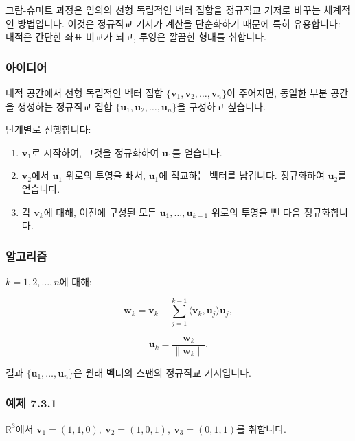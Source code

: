 \documentclass[
  12pt,
  a4paper,
]{article}
\begin{document}
그람-슈미트 과정은 임의의 선형 독립적인 벡터 집합을 정규직교 기저로 바꾸는 체계적인 방법입니다. 이것은 정규직교 기저가 계산을 단순화하기 때문에 특히 유용합니다: 내적은 간단한 좌표 비교가 되고, 투영은 깔끔한 형태를 취합니다.

\subsubsection{아이디어}\label{the-idea}

내적 공간에서 선형 독립적인 벡터 집합 \(\{\mathbf{v}_1, \mathbf{v}_2, \dots, \mathbf{v}_n\}\)이 주어지면, 동일한 부분 공간을 생성하는 정규직교 집합 \(\{\mathbf{u}_1, \mathbf{u}_2, \dots, \mathbf{u}_n\}\)을 구성하고 싶습니다.

단계별로 진행합니다:

\begin{enumerate}
\def\labelenumi{\arabic{enumi}.}
\item
  \(\mathbf{v}_1\)로 시작하여, 그것을 정규화하여 \(\mathbf{u}_1\)를 얻습니다.
\item
  \(\mathbf{v}_2\)에서 \(\mathbf{u}_1\) 위로의 투영을 빼서, \(\mathbf{u}_1\)에 직교하는 벡터를 남깁니다. 정규화하여 \(\mathbf{u}_2\)를 얻습니다.
\item
  각 \(\mathbf{v}_k\)에 대해, 이전에 구성된 모든 \(\mathbf{u}_1, \dots, \mathbf{u}_{k-1}\) 위로의 투영을 뺀 다음 정규화합니다.
\end{enumerate}

\subsubsection{알고리즘}\label{the-algorithm}

\(k = 1, 2, \dots, n\)에 대해:

\[\mathbf{w}_k = \mathbf{v}_k - \sum_{j=1}^{k-1} \langle \mathbf{v}_k, \mathbf{u}_j \rangle \mathbf{u}_j,\]

\[\mathbf{u}_k = \frac{\mathbf{w}_k}{\|\mathbf{w}_k\|}.\]

결과 \(\{\mathbf{u}_1, \dots, \mathbf{u}_n\}\)은 원래 벡터의 스팬의 정규직교 기저입니다.

\subsubsection{예제 7.3.1}\label{example-731}

\(\mathbb{R}^3\)에서 \(\mathbf{v}_1 = (1,1,0), \ \mathbf{v}_2 = (1,0,1), \ \mathbf{v}_3 = (0,1,1)\)를 취합니다.
\end{document}
